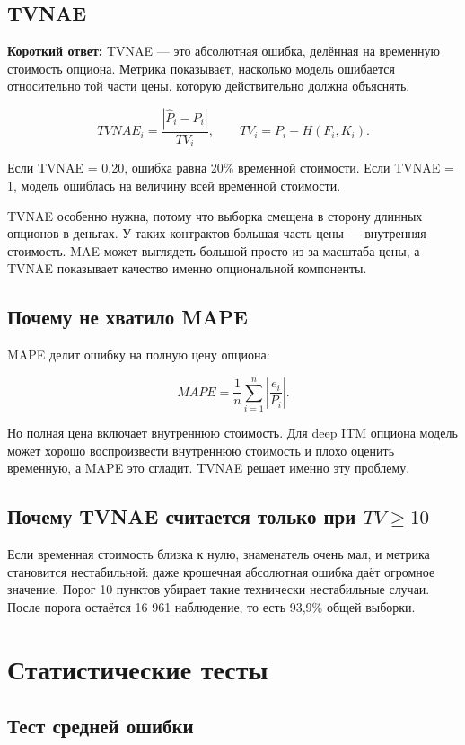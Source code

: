 \documentclass[11pt,a4paper]{article}
\newcommand{\answerbox}[1]{%
  \noindent\colorbox{softblue}{%
    \parbox{\dimexpr\linewidth-2\fboxsep\relax}{\textbf{Короткий ответ:} #1}%
  }\par\vspace{0.2em}
}
\begin{document}
\subsection{TVNAE}

\answerbox{TVNAE --- это абсолютная ошибка, делённая на временную стоимость опциона. Метрика показывает, насколько модель ошибается относительно той части цены, которую действительно должна объяснять.}

\[
TVNAE_i=\frac{|\widehat{P}_i-P_i|}{TV_i}, \qquad TV_i=P_i-H(F_i,K_i).
\]

Если TVNAE = 0,20, ошибка равна 20\% временной стоимости. Если TVNAE = 1, модель ошиблась на величину всей временной стоимости.

TVNAE особенно нужна, потому что выборка смещена в сторону длинных опционов в деньгах. У таких контрактов большая часть цены --- внутренняя стоимость. MAE может выглядеть большой просто из-за масштаба цены, а TVNAE показывает качество именно опциональной компоненты.

\subsection{Почему не хватило MAPE}

MAPE делит ошибку на полную цену опциона:

\[
MAPE=\frac{1}{n}\sum_{i=1}^{n}\left|\frac{e_i}{P_i}\right|.
\]

Но полная цена включает внутреннюю стоимость. Для deep ITM опциона модель может хорошо воспроизвести внутреннюю стоимость и плохо оценить временную, а MAPE это сгладит. TVNAE решает именно эту проблему.

\subsection{Почему TVNAE считается только при $TV\geq10$}

Если временная стоимость близка к нулю, знаменатель очень мал, и метрика становится нестабильной: даже крошечная абсолютная ошибка даёт огромное значение. Порог 10 пунктов убирает такие технически нестабильные случаи. После порога остаётся 16 961 наблюдение, то есть 93,9\% общей выборки.

\section{Статистические тесты}

\subsection{Тест средней ошибки}
\end{document}
